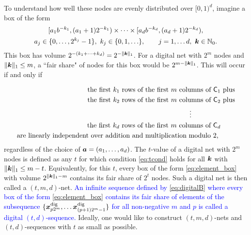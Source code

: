 \documentclass{svproc}
\newcommand{\FJHNote}[1]{{\textcolor{blue}{#1}}}
\begin{document}
To understand how well these nodes are evenly distributed over $[0,1)^d$, imagine a box of the form
\begin{multline} \label{eq:element_box}
	[a_1 b^{-k_1}, (a_1 + 1) 2^{-k_1}) \times \cdots \times [a_d b^{-k_d}, (a_d + 1) 2^{-k_d}), \\
	a_j \in \{0, \ldots, 2^{k_j} - 1\}, \ k_j \in \{0,1, \ldots \}, \qquad j =1, \ldots d, \ {\boldsymbol{k}} \in {\mathbb{N}}_0.
\end{multline}
This box has volume $2^{-(k_1 + \cdots +k_d)} = 2^{-\lVert{\boldsymbol{k}}\rVert_1}$.  For a digital net with $2^m$ nodes and $\lVert {\boldsymbol{k}} \rVert_1 \le m$, a ``fair share" of nodes for this box would be $2^{m- \lVert {\boldsymbol{k}} \rVert_1}$.  This will occur if and only if

\begin{equation} \label{eq:tcond}
\begin{aligned}
	\text{the first $k_1$ rows of the first $m$ columns of $\mathsf{C}_1$} & \text{ plus} \\
	\text{the first $k_2$ rows of the first $m$ columns of $\mathsf{C}_2$} & \text{ plus} \\
	 \vdots \hspace{10ex} & \\
	\text{ the first $k_d$ rows of the first $m$ columns of $\mathsf{C}_d$} &\\
	\text{are linearly independent over addition and multiplication modulo $2$, }
\end{aligned}
\end{equation}
regardless of the choice of ${\boldsymbol{a}} = (a_1, \ldots, a_d)$.  The $t$-value of a digital net with $2^m$ nodes is defined as any $t$ for which condition \eqref{eq:tcond} holds for all ${\boldsymbol{k}}$ with $\lVert {\boldsymbol{k}} \rVert_1 \le m-t$.  Equivalently, for this $t$, every box of the form \eqref{eq:element_box} with volume $2^{\lVert {\boldsymbol{k}} \rVert_1 - m}$ contains its fair share of $2^t$ nodes.  Such a digital net is then called a $(t,m,d)$-net.  \FJHNote{An infinite sequence defined by \eqref{eq:digitalB} where every box of the form \eqref{eq:element_box} contains its fair share of elements of the subsequence $\{{\boldsymbol{x}}^{\text{dig}}_{p 2^m}, \ldots {\boldsymbol{x}}^{\text{dig}}_{(p+1) 2^m-1} \}$ for all non-negative $m$ and $p$ is called a digital $(t,d)$-sequence.} Ideally, one would like to construct $(t,m,d)$-nets and $(t,d)$-sequences with $t$ as small as possible.
\end{document}
